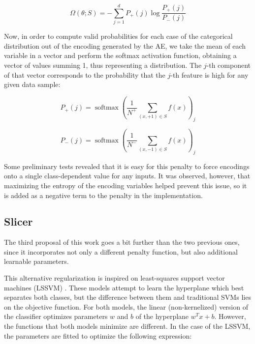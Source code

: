 \begin{equation} \Omega(\theta;S)=- \sum_{j=1}^{d}P_+(j) \log\frac{P_+(j)}{P_-(j)}\end{equation}


Now, in order to compute valid probabilities for each case of the categorical distribution out of the encoding generated by the AE, we take the mean of each variable in a vector and perform the softmax activation function, obtaining a vector of values summing 1, thus representing a distribution. The $j$-th component of that vector corresponds to the probability that the $j$-th feature is high for any given data sample:

\begin{equation} P_+(j)=\operatorname{softmax}\left(\frac{1}{N^{+}}\sum_{(x,+1)\in S}f(x)\right)_j \end{equation}

\begin{equation} P_-(j)=\operatorname{softmax}\left(\frac{1}{N^{-}}\sum_{(x,-1)\in S}f(x)\right)_j \end{equation}

Some preliminary tests revealed that it is easy for this penalty to force encodings onto a single class-dependent value for any inputs. It was observed, however, that maximizing the entropy of the encoding variables helped prevent this issue, so it is added as a negative term to the penalty in the implementation.

\subsection{Slicer}

The third proposal of this work goes a bit further than the two previous ones, since it incorporates not only a different penalty function, but also additional learnable parameters.

This alternative regularization is inspired on least-squares support vector machines (LSSVM) \cite{suykens1999least}. These models attempt to learn the hyperplane which best separates both classes, but the difference between them and traditional SVMs lies on the objective function. For both models, the linear (non-kernelized) version of the classifier optimizes parameters $w$ and $b$ of the hyperplane $w^Tx+b$. However, the functions that both models minimize are different. In the case of the LSSVM, the parameters are fitted to optimize the following expression:

